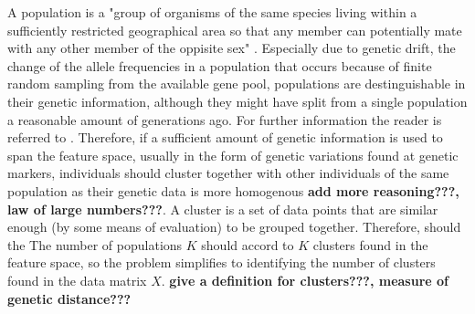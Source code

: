 \documentclass[a4paper, 11pt]{article}
\begin{document}
A population is a "group of organisms of the same species living within a sufficiently restricted geographical area so that any member can potentially mate with any other member of the oppisite sex" \parencite{hartl1997principles}. Especially due to genetic drift, the change of the allele frequencies in a population that occurs because of finite random sampling from the available gene pool, populations are destinguishable in their genetic information, although they might have split from a single population a reasonable amount of generations ago. For further information the reader is referred to \parencite{hartl1997principles}. Therefore, if a sufficient amount of genetic information is used to span the feature space, usually in the form of genetic variations found at genetic markers, individuals should cluster together with other individuals of the same population as their genetic data is more homogenous \textbf{add more reasoning???, law of large numbers???}. A cluster is a set of data points that are similar enough (by some means of evaluation) to be grouped together. Therefore, should the  The number of populations $K$ should accord to $K$ clusters found in the feature space, so the problem simplifies to identifying the number of clusters found in the data matrix $X$. \textbf{give a definition for clusters???, measure of genetic distance???}
\end{document}
